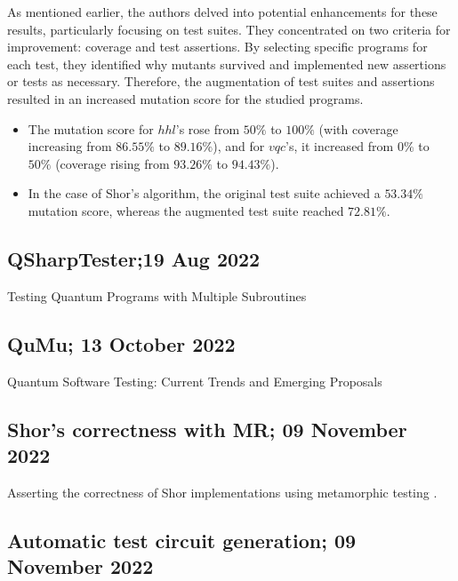 \begin{itemize}
As mentioned earlier, the authors delved into potential enhancements for these results, particularly focusing on test suites. They concentrated on two criteria for improvement: coverage and test assertions. By selecting specific programs for each test, they identified why mutants survived and implemented new assertions or tests as necessary. Therefore, the augmentation of test suites and assertions resulted in an increased mutation score for the studied programs.

\begin{itemize}
    \item The mutation score for $hhl$’s rose from $50\%$ to $100\%$ (with coverage increasing from $86.55\%$ to $89.16\%$), and for $vqc$’s, it increased from $0\%$ to $50\%$ (coverage rising from $93.26\%$ to $94.43\%$).
    \item In the case of Shor's algorithm, the original test suite achieved a $53.34\%$ mutation score, whereas the augmented test suite reached $72.81\%$.
\end{itemize}

\vspace{15pt}
\subsection{QSharpTester;19 Aug 2022}

Testing Quantum Programs with Multiple Subroutines \cite{long2022testing}

\vspace{15pt}
\subsection{QuMu; 13 October 2022}

Quantum Software Testing: Current Trends and Emerging Proposals \cite{de2022quantum}

\vspace{15pt}
\subsection{Shor's correctness with MR; 09 November 2022}

Asserting the correctness of Shor implementations using metamorphic testing \cite{costa2022asserting}.

\vspace{15pt}
\subsection{Automatic test circuit generation; 09 November 2022}


\end{itemize}
